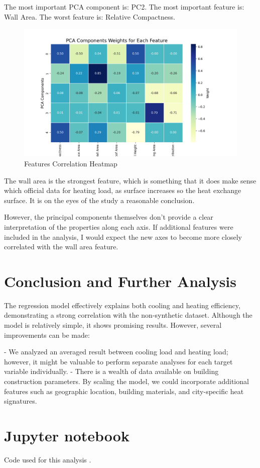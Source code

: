 \documentclass{article}
\begin{document}
The most important PCA component is: PC2.
The most important feature is: Wall Area.
 The worst feature is: Relative Compactness.

\begin{figure}[H]  
    \centering
    \includegraphics[width=1\linewidth]{PCAComponents.png}
    \caption{Features Correlation Heatmap}
    \vspace{-1em} %
\end{figure}

The wall area is the strongest feature, which is something that it does make sense which official data
for heating load, as surface increases so the heat exchange surface. It is on the eyes of the study a reasonable 
conclusion.

 However, the principal components themselves don’t provide a clear interpretation of the properties along each axis. If additional features were included in the analysis, I would expect the new axes to become more closely correlated with the wall area feature.

\section{Conclusion and Further Analysis}

The regression model effectively explains both cooling and heating efficiency, demonstrating a strong correlation with the non-synthetic dataset. Although the model is relatively simple, it shows promising results. However, several improvements can be made:

- We analyzed an averaged result between cooling load and heating load; however, it might be valuable to perform separate analyses for each target variable individually.
- There is a wealth of data available on building construction parameters. By scaling the model, we could incorporate additional features such as geographic location, building materials, and city-specific heat signatures.

\appendix
\section{Jupyter notebook}
Code used for this analysis \cite{arath2024github}.

\label{sec:appendix}


\end{document}
